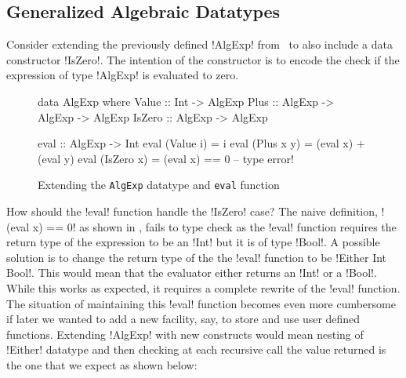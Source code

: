 \documentclass[screen,nonacm,manuscript,review]{acmart} %
\begin{document}
\subsection{Generalized Algebraic Datatypes}
Consider extending the previously defined !AlgExp! from~ to also
include a data constructor !IsZero!. The intention of the constructor is to encode the
check if the expression of type !AlgExp! is evaluated to zero.

\begin{figure}[ht]
\centering
\begin{minipage}{0.5\linewidth}
\begin{CenteredBox}
\begin{code}
data AlgExp where
  Value  :: Int              -> AlgExp
  Plus   :: AlgExp -> AlgExp -> AlgExp
  IsZero :: AlgExp           -> AlgExp
\end{code}
\end{CenteredBox}
\end{minipage}%
\begin{minipage}{0.5\linewidth}
\begin{CenteredBox}
\begin{code}
eval :: AlgExp -> Int
eval (Value i) = i
eval (Plus x y) = (eval x) + (eval y)
eval (IsZero x) = (eval x) == 0 -- type error!
\end{code}
\end{CenteredBox}
\end{minipage}
\caption{Extending the \texttt{AlgExp} datatype and \texttt{eval} function}
\label{fig:algexp-eval}
\end{figure}

How should the !eval! function handle the !IsZero! case? The naive
definition, !(eval x) == 0! as shown in ,
fails to type check as the !eval! function requires the return
type of the expression to be an !Int! but
it is of type !Bool!. A possible solution is to change the return type
of the the !eval! function to be !Either Int Bool!. This would mean
that the evaluator either returns an !Int! or a !Bool!. While this works as
expected, it requires a complete rewrite of the !eval! function. The
situation of maintaining this !eval! function becomes even more
cumbersome if later we wanted to add a new facility, say, to store and use user
defined functions. Extending !AlgExp! with new constructs would mean
nesting of !Either! datatype and then checking at each recursive
call the value returned is the one that we expect as shown below:
\end{document}
